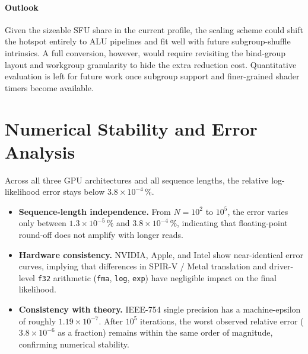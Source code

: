 \documentclass[PhD]{PHlab-thesis}
\begin{document}
\paragraph{Outlook}
Given the sizeable SFU share in the current profile, the scaling scheme could shift the hotspot entirely to ALU pipelines and fit well with future subgroup-shuffle intrinsics.  
A full conversion, however, would require revisiting the bind-group layout and workgroup granularity to hide the extra reduction cost.  
Quantitative evaluation is left for future work once subgroup support and finer-grained shader timers become available.


\section{Numerical Stability and Error Analysis}
Across all three GPU architectures and all sequence lengths, the relative log-likelihood error stays below $3.8\times10^{-4}\,\%$.
\begin{itemize}
  \item \textbf{Sequence-length independence.} From $N=10^{2}$ to $10^{5}$, the error varies only between $1.3\times10^{-5}\,\%$ and $3.8\times10^{-4}\,\%$, indicating that floating-point round-off does not amplify with longer reads.
  \item \textbf{Hardware consistency.} NVIDIA, Apple, and Intel show near-identical error curves, implying that differences in SPIR-V / Metal translation and driver-level \texttt{f32} arithmetic (\texttt{fma}, \texttt{log}, \texttt{exp}) have negligible impact on the final likelihood.
  \item \textbf{Consistency with theory.} IEEE-754 single precision has a machine-epsilon of roughly $1.19\times10^{-7}$. After $10^{5}$ iterations, the worst observed relative error ($3.8\times10^{-6}$ as a fraction) remains within the same order of magnitude, confirming numerical stability.
\end{itemize}
\end{document}

